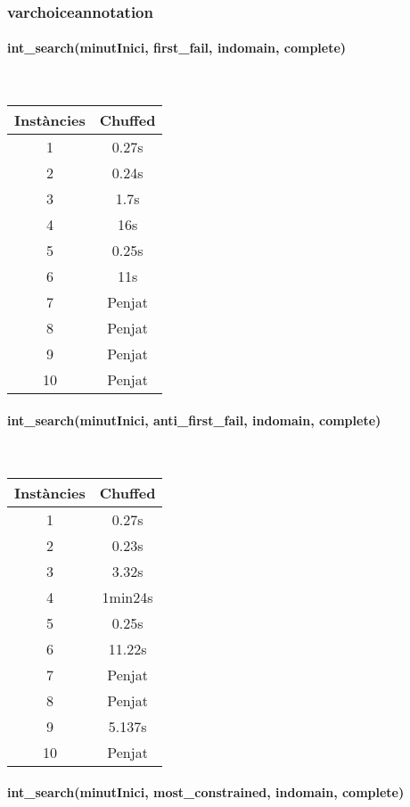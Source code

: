 \documentclass[11pt,a4paper,twoside]{report}
\begin{document}
\subsubsection{varchoiceannotation}


\paragraph*{int\_search(minutInici, first\_fail, indomain, complete)}~\\

\begin{tabular}{|c|c|}
    \hline
    Instàncies & Chuffed \\
    \hline
    1 & 0.27s \\
    2 & 0.24s \\
    3 & 1.7s  \\
    4 & 16s \\
    5 & 0.25s \\
    6 & 11s  \\
    7 & Penjat  \\
    8 & Penjat  \\
    9 & Penjat  \\
    10&Penjat  \\

    \hline
\end{tabular}

\paragraph*{int\_search(minutInici, anti\_first\_fail, indomain, complete)}~\\

\begin{tabular}{|c|c|}
    \hline
    Instàncies & Chuffed \\
    \hline
    1 & 0.27s \\
    2 & 0.23s \\
    3 & 3.32s  \\
    4 & 1min24s \\
    5 & 0.25s  \\
    6 & 11.22s  \\
    7 & Penjat   \\
    8 & Penjat   \\
    9 & 5.137s \\
    10 & Penjat   \\
    \hline
\end{tabular}

\paragraph*{int\_search(minutInici, most\_constrained, indomain, complete)} ~\\
\end{document}
